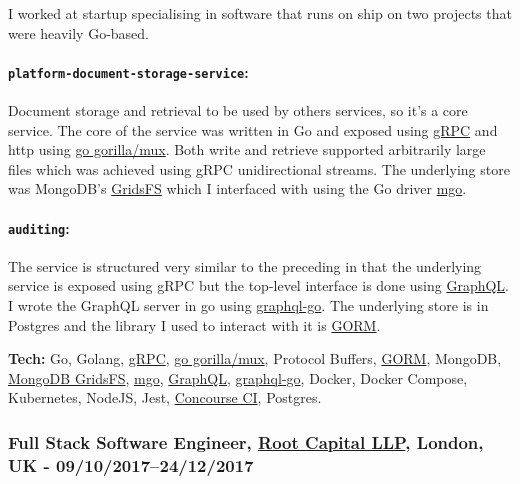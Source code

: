 \documentclass[
  a4paper,
  8pt,
]{article}
\begin{document}
\begin{multicols}{2}
I worked at startup specialising in software that runs on ship on two
projects that were heavily Go-based.

\hypertarget{platform-document-storage-service}{%
\paragraph{\texorpdfstring{\textbf{\texttt{platform-document-storage-service}}:}{platform-document-storage-service:}}\label{platform-document-storage-service}}

Document storage and retrieval to be used by others services, so it's a
core service. The core of the service was written in Go and exposed
using \href{https://grpc.io/}{gRPC} and http using
\href{https://github.com/gorilla/mux}{go gorilla/mux}. Both write and
retrieve supported arbitrarily large files which was achieved using gRPC
unidirectional streams. The underlying store was MongoDB's
\href{https://docs.mongodb.com/manual/core/gridfs/}{GridsFS} which I
interfaced with using the Go driver \href{https://gopkg.in/mgo.v2}{mgo}.

\hypertarget{auditing}{%
\paragraph{\texorpdfstring{\textbf{\texttt{auditing}}:}{auditing:}}\label{auditing}}

The service is structured very similar to the preceding in that the
underlying service is exposed using gRPC but the top-level interface is
done using \href{graphql.org}{GraphQL}. I wrote the GraphQL server in go
using \href{https://github.com/graph-gophers/graphql-go}{graphql-go}.
The underlying store is in Postgres and the library I used to interact
with it is \href{http://gorm.io/}{GORM}.

\textbf{Tech:} Go, Golang, \href{https://grpc.io/}{gRPC},
\href{https://github.com/gorilla/mux}{go gorilla/mux}, Protocol Buffers,
\href{http://gorm.io/}{GORM}, MongoDB,
\href{https://docs.mongodb.com/manual/core/gridfs/}{MongoDB GridsFS},
\href{https://gopkg.in/mgo.v2}{mgo}, \href{graphql.org}{GraphQL},
\href{https://github.com/graph-gophers/graphql-go}{graphql-go}, Docker,
Docker Compose, Kubernetes, NodeJS, Jest,
\href{https://concourse-ci.org/}{Concourse CI}, Postgres.

\hypertarget{full-stack-software-engineer-root-capital-llp-london-uk---0910201724122017}{%
\subsubsection{\texorpdfstring{Full Stack Software Engineer,
\href{https://www.rootcapital.co.uk}{Root Capital LLP}, London, UK -
09/10/2017--24/12/2017}{Full Stack Software Engineer, Root Capital LLP, London, UK - 09/10/2017--24/12/2017}}\label{full-stack-software-engineer-root-capital-llp-london-uk---0910201724122017}}


\end{multicols}
\end{document}
